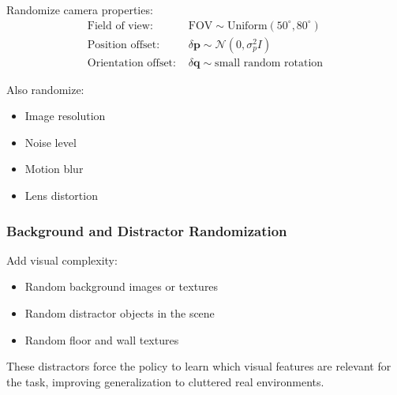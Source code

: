 Randomize camera properties:
\begin{align}
\text{Field of view: } &\text{FOV} \sim \text{Uniform}(50^\circ, 80^\circ) \\
\text{Position offset: } &\delta\mathbf{p} \sim \mathcal{N}(0, \sigma_p^2 I) \\
\text{Orientation offset: } &\delta\mathbf{q} \sim \text{small random rotation}
\end{align}

Also randomize:
\begin{itemize}
    \item Image resolution
    \item Noise level
    \item Motion blur
    \item Lens distortion
\end{itemize}

\subsubsection{Background and Distractor Randomization}

Add visual complexity:
\begin{itemize}
    \item Random background images or textures
    \item Random distractor objects in the scene
    \item Random floor and wall textures
\end{itemize}

These distractors force the policy to learn which visual features are relevant for the task, improving generalization to cluttered real environments.

